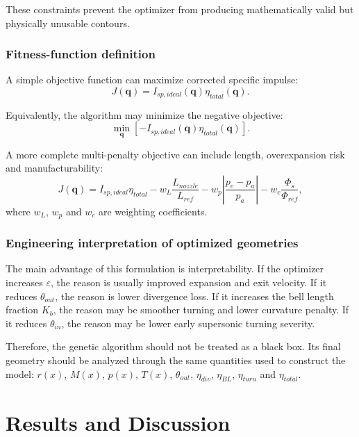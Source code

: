 \documentclass[11pt,a4paper]{article}
\begin{document}
These constraints prevent the optimizer from producing mathematically valid but physically unusable contours.

\subsubsection{Fitness-function definition}

A simple objective function can maximize corrected specific impulse:
\begin{equation}
J(\bm{q})=I_{sp,ideal}(\bm{q})\eta_{total}(\bm{q}).
\label{eq:objective_Isp}
\end{equation}

Equivalently, the algorithm may minimize the negative objective:
\begin{equation}
\min_{\bm{q}}\left[-I_{sp,ideal}(\bm{q})\eta_{total}(\bm{q})\right].
\end{equation}

A more complete multi-penalty objective can include length, overexpansion risk and manufacturability:
\begin{equation}
J(\bm{q})=I_{sp,ideal}\eta_{total}
-w_L\frac{L_{nozzle}}{L_{ref}}
-w_p\left|\frac{p_e-p_a}{p_a}\right|
-w_c\frac{\Phi_s}{\Phi_{ref}},
\label{eq:objective_full}
\end{equation}
where $w_L$, $w_p$ and $w_c$ are weighting coefficients.

\subsubsection{Engineering interpretation of optimized geometries}

The main advantage of this formulation is interpretability. If the optimizer increases $\varepsilon$, the reason is usually improved expansion and exit velocity. If it reduces $\theta_{out}$, the reason is lower divergence loss. If it increases the bell length fraction $K_b$, the reason may be smoother turning and lower curvature penalty. If it reduces $\theta_{in}$, the reason may be lower early supersonic turning severity.

Therefore, the genetic algorithm should not be treated as a black box. Its final geometry should be analyzed through the same quantities used to construct the model: $r(x)$, $M(x)$, $p(x)$, $T(x)$, $\theta_{out}$, $\eta_{div}$, $\eta_{BL}$, $\eta_{turn}$ and $\eta_{total}$.

\section{Results and Discussion}
\end{document}
